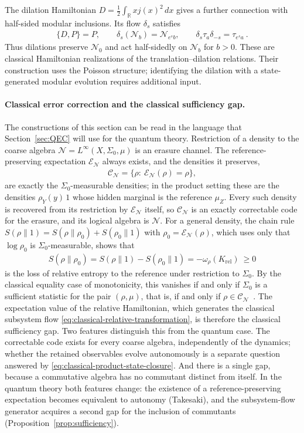 \documentclass[a4paper,11pt]{article}
\theoremstyle{definition}
\newcommand{\mN}{\mathcal{N}}
\newcommand{\mE}{\mathcal{E}}
\begin{document}
The dilation Hamiltonian $D=\frac12\int_{\mathbb R}xj(x)^2\,dx$ gives a further connection with half-sided modular inclusions. Its flow $\delta_s$ satisfies
\begin{align}
    \{D,P\}=P,
    \qquad \delta_s(\mN_b)=\mN_{e^s b},
    \qquad \delta_s\tau_a\delta_{-s}=\tau_{e^s a}\ .
\end{align}
Thus dilations preserve $\mN_0$ and act half-sidedly on $\mN_b$ for $b>0$. These are classical Hamiltonian realizations of the translation--dilation relations. Their construction uses the Poisson structure; identifying the dilation with a state-generated modular evolution requires additional input.

\paragraph{Classical error correction and the classical sufficiency gap.}
The constructions of this section can be read in the language that Section~\ref{sec:QEC} will use for the quantum theory. Restriction of a density to the coarse algebra $\mN=L^\infty(X,\Sigma_0,\mu)$ is an erasure channel. The reference-preserving expectation $\mE_{\mN}$ always exists, and the densities it preserves,
\begin{align}
 \mathcal C_{\mN}=\{\rho:\ \mE_{\mN}(\rho)=\rho\},
\end{align}
are exactly the $\Sigma_0$-measurable densities; in the product setting these are the densities $\rho_Y(y)\,1$ whose hidden marginal is the reference $\mu_Z$. Every such density is recovered from its restriction by $\mE_{\mN}$ itself, so $\mathcal C_{\mN}$ is an exactly correctable code for the erasure, and its logical algebra is $\mN$. For a general density, the chain rule $S(\rho\|1)=S(\rho\|\rho_0)+S(\rho_0\|1)$ with $\rho_0=\mE_{\mN}(\rho)$, which uses only that $\log\rho_0$ is $\Sigma_0$-measurable, shows that
\begin{align}\label{eq:classical-sufficiency-gap}
 S(\rho\|\rho_0)=S(\rho\|1)-S(\rho_0\|1)=-\omega_\rho(K_{\mathrm{rel}})\ \ge0
\end{align}
is the loss of relative entropy to the reference under restriction to $\Sigma_0$. By the classical equality case of monotonicity, this vanishes if and only if $\Sigma_0$ is a sufficient statistic for the pair $(\rho,\mu)$, that is, if and only if $\rho\in\mathcal C_{\mN}$~\cite{OhyaPetz1993}. The expectation value of the relative Hamiltonian, which generates the classical subsystem flow \eqref{eq:classical-relative-transformation}, is therefore the classical sufficiency gap. Two features distinguish this from the quantum case. The correctable code exists for every coarse algebra, independently of the dynamics; whether the retained observables evolve autonomously is a separate question answered by \eqref{eq:classical-product-state-closure}. And there is a single gap, because a commutative algebra has no commutant distinct from itself. In the quantum theory both features change: the existence of a reference-preserving expectation becomes equivalent to autonomy (Takesaki), and the subsystem-flow generator acquires a second gap for the inclusion of commutants (Proposition~\ref{prop:sufficiency}).





\end{document}
